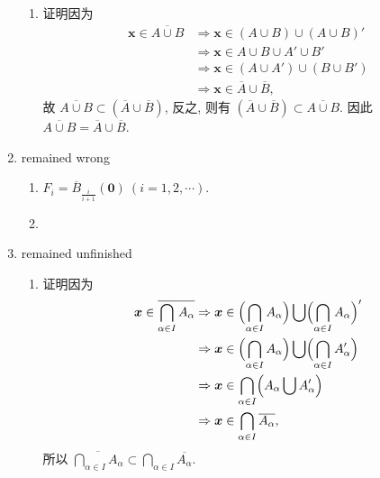 \begin{enumerate}
\begin{enumerate}[(1)]
            \item %
                {\heiti 证明}\quad 因为
                \begin{align*}
                    \boldsymbol{x} \in \overline{A \cup B} &\Rightarrow \boldsymbol{x} \in (A \cup B) \cup (A \cup B)' \\
                    &\Rightarrow \boldsymbol{x} \in A \cup B \cup A' \cup B' \\
                    &\Rightarrow \boldsymbol{x} \in (A \cup A') \cup (B \cup B') \\
                    &\Rightarrow \boldsymbol{x} \in \overline{A} \cup \overline{B},
                \end{align*}
                故 $\overline{A \cup B} \subset (\overline{A} \cup \overline{B})$, 反之, 则有 $(\overline{A} \cup \overline{B}) \subset \overline{A \cup B}$. 因此 $\overline{A \cup B} = \overline{A} \cup \overline{B}$.
        \end{enumerate}
    \item %
        {\color{red} remained wrong}
        \begin{enumerate}[(1)]
            \item %
                $\displaystyle{F_i = \overline{B}_{\frac{i}{i+1}}(\boldsymbol{0})\ (i = 1, 2, \cdots)}$.
            \item %
        \end{enumerate}
    \item %
        {\color{red} remained unfinished}
        \begin{enumerate}[(1)]
            \item %
                {\heiti 证明}\quad 因为
                \begin{align*}
                    \boldsymbol{x} \in \overline{\bigcap_{\alpha \in I}A_\alpha} &\Rightarrow \boldsymbol{x} \in \Bigl(\bigcap_{\alpha \in I}A_\alpha\Bigr) \bigcup \Bigl(\bigcap_{\alpha \in I}A_\alpha\Bigr)' \\
                    &\Rightarrow \boldsymbol{x} \in \Bigl(\bigcap_{\alpha \in I}A_\alpha\Bigr) \bigcup \Bigl(\bigcap_{\alpha \in I}A_\alpha'\Bigr) \\
                    &\Rightarrow \boldsymbol{x} \in \bigcap_{\alpha \in I}\Bigl(A_\alpha \bigcup A_\alpha'\Bigr) \\
                    &\Rightarrow \boldsymbol{x} \in \bigcap_{\alpha \in I}\overline{A_\alpha},
                \end{align*}
                所以 $\displaystyle{\overline{\bigcap_{\alpha \in I}A_\alpha} \subset \bigcap_{\alpha \in I}\overline{A_\alpha}}$.

\end{enumerate}
\end{enumerate}
